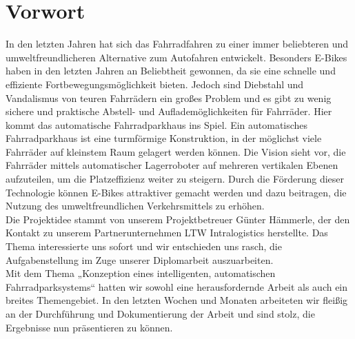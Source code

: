 \section*{Vorwort}
In den letzten Jahren hat sich das Fahrradfahren zu einer immer beliebteren und umweltfreundlicheren Alternative zum Autofahren entwickelt. Besonders E-Bikes haben in den letzten Jahren an Beliebtheit gewonnen, da sie eine schnelle und effiziente Fortbewegungsmöglichkeit bieten. Jedoch sind Diebstahl und Vandalismus von teuren Fahrrädern ein großes Problem und es gibt zu wenig sichere und praktische Abstell- und Auflademöglichkeiten für Fahrräder. Hier kommt das automatische Fahrradparkhaus ins Spiel. Ein automatisches Fahrradparkhaus ist eine turmförmige Konstruktion, in der möglichst viele Fahrräder auf kleinstem Raum gelagert werden können. Die Vision sieht vor, die Fahrräder mittels automatischer Lagerroboter auf mehreren vertikalen Ebenen aufzuteilen, um die Platzeffizienz weiter zu steigern. Durch die Förderung dieser Technologie können E-Bikes attraktiver gemacht werden und dazu beitragen, die Nutzung des umweltfreundlichen Verkehrsmittels zu erhöhen.\\
Die Projektidee stammt von unserem Projektbetreuer Günter Hämmerle, der den Kontakt zu unserem Partnerunternehmen LTW Intralogistics herstellte. Das Thema interessierte uns sofort und wir entschieden uns rasch, die Aufgabenstellung im Zuge unserer Diplomarbeit auszuarbeiten.\\
Mit dem Thema „Konzeption eines intelligenten, automatischen Fahrradparksystems“ hatten wir sowohl eine herausfordernde Arbeit als auch ein breites Themengebiet. In den letzten Wochen und Monaten arbeiteten wir fleißig an der Durchführung und Dokumentierung der Arbeit und sind stolz, die Ergebnisse nun präsentieren zu können.\\
